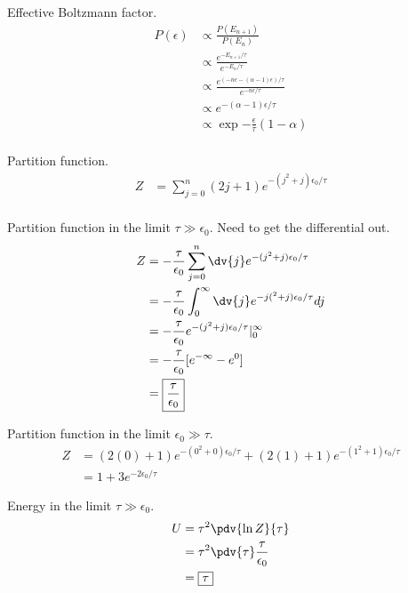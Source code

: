 \documentclass[newpage]{homework}
\begin{document}
\maketitle


\question
Effective Boltzmann factor.
\begin{align*}
    P(\epsilon) &\propto \frac{P(E_{n+1})}{P(E_n)}  \\
    &\propto	\frac{e^{-E_{n+1}/\tau}}{e^{-E_n/\tau}}	\\
    &\propto	\frac{e^{(-n\epsilon - (\alpha-1)\epsilon)/\tau}}{e^{-n\epsilon/\tau}}	\\
    &\propto	e^{-(\alpha-1)\epsilon/\tau}	\\
    &\propto	\boxed{\exp{-\frac{\epsilon}{\tau}(1-\alpha)}}	\\
\end{align*}

\question
Partition function.
\begin{align*}
    Z	&=	\boxed{\sum_{j=0}^n (2j+1) e^{-(j^2+j)\epsilon_0/\tau}}	\\
\end{align*}

Partition function in the limit $\tau \gg \epsilon_0$. Need to get the differential out.
\begin{align*}
    Z   &=	- \frac{\tau}{\epsilon_0} \sum_{j=0}^n \dv{j} e^{-(j^2+j)\epsilon_0/\tau}  \\
    &=	- \frac{\tau}{\epsilon_0}  \int_0^\infty \dv{j} e^{-j(^2+j)\epsilon_0/\tau} dj	\\
    &=	- \frac{\tau}{\epsilon_0}  e^{-(j^2+j)\epsilon_0/\tau}|_0^\infty	\\
    &=  - \frac{\tau}{\epsilon_0} [e^{-\infty} - e^{0}]   \\
    &=	\boxed{\frac{\tau}{\epsilon_0}}	\\
\end{align*}

Partition function in the limit $\epsilon_0 \gg \tau$.
\begin{align*}
    Z	&=	(2(0)+1) e^{-(0^2+0)\epsilon_0/\tau} +
            (2(1)+1) e^{-(1^2+1)\epsilon_0/\tau}	\\
        &=  \boxed{1 + 3e^{-2\epsilon_0/\tau}}
\end{align*}

Energy in the limit $\tau \gg \epsilon_0$.
\begin{align*}
    U	&=	\tau^2 \pdv{\ln Z}{\tau}	\\
        &=  \tau^2 \pdv{\tau} \frac{\tau}{\epsilon_0}\\
        &=	\boxed{\tau}	\\
\end{align*}
\end{document}
